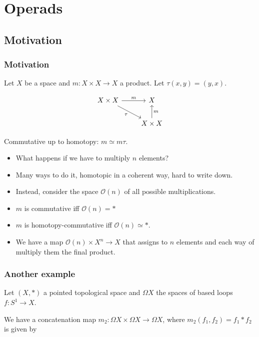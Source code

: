 \documentclass{beamer}
\theoremstyle{definition}
\begin{document}
\section{Operads}

\subsection{Motivation}

\begin{frame}[fragile]
\frametitle{Motivation}
Let $X$ be a space and $m:X\times X\to X$ a product. Let $\tau(x,y)=(y,x)$.\pause

\[
\begin{tikzcd}
X\times X\arrow[r, "m"]\arrow[dr, "\tau"'] & X\\
& X\times X\arrow[u, "m"']
\end{tikzcd}
\]\pause

Commutative up to homotopy: $m\simeq m\tau$.

\end{frame}

\begin{frame}
\begin{itemize}
\item<1-> What happens if we have to multiply $n$ elements? 
\item<2-> Many ways to do it, homotopic in a coherent way, hard to write down.
\item<3-> Instead, consider the space $\mathcal{O}(n)$ of all possible multiplications.
\item<4-> $m$ is commutative iff $\mathcal{O}(n)=*$
\item<5-> $m$ is homotopy-commutative iff $\mathcal{O}(n)\simeq *$.
\item<6-> We have a map $\mathcal{O}(n)\times X^n\to X$ that assigns to $n$ elements and each way of multiply them the final product.
\end{itemize}
\end{frame}


\begin{frame}
\frametitle{Another example}
Let $(X,*)$ a pointed topological space and $\Omega X$ the spaces of based loops $f:S^1\to X$.\pause

We have a concatenation map $m_2:\Omega X\times \Omega X\to \Omega X$, where $m_2(f_1,f_2)=f_1*f_2$ is given by\pause

\end{frame}
\end{document}
